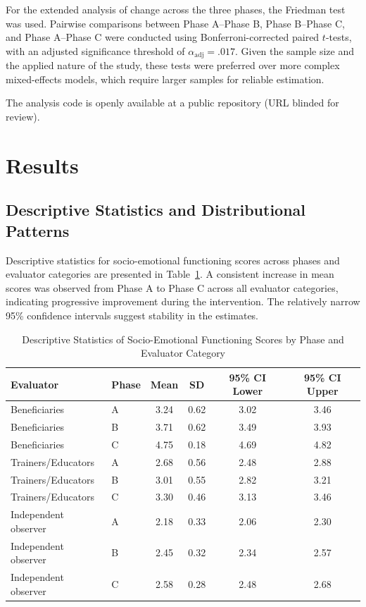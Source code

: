 \documentclass[12pt,a4paper]{article}
\begin{document}
For the extended analysis of change across the three phases, the Friedman test was used. Pairwise comparisons between Phase A--Phase B, Phase B--Phase C, and Phase A--Phase C were conducted using Bonferroni-corrected paired $t$-tests, with an adjusted significance threshold of $\alpha_{\mathrm{adj}}=.017$. Given the sample size and the applied nature of the study, these tests were preferred over more complex mixed-effects models, which require larger samples for reliable estimation.

The analysis code is openly available at a public repository (URL blinded for review).


\section{Results}

\subsection{Descriptive Statistics and Distributional Patterns}

Descriptive statistics for socio-emotional functioning scores across phases and evaluator categories are presented in Table~\ref{tab:descriptive_statistics}. A consistent increase in mean scores was observed from Phase A to Phase C across all evaluator categories, indicating progressive improvement during the intervention. The relatively narrow 95\% confidence intervals suggest stability in the estimates.

\begin{table}[!t]
\caption{Descriptive Statistics of Socio-Emotional Functioning Scores by Phase and Evaluator Category}
\label{tab:descriptive_statistics}
\centering
\begin{tabular}{llcccc}
\hline
\textbf{Evaluator} & \textbf{Phase} & \textbf{Mean} & \textbf{SD} & \textbf{95\% CI Lower} & \textbf{95\% CI Upper} \\
\hline
Beneficiaries & A & 3.24 & 0.62 & 3.02 & 3.46 \\
Beneficiaries & B & 3.71 & 0.62 & 3.49 & 3.93 \\
Beneficiaries & C & 4.75 & 0.18 & 4.69 & 4.82 \\
Trainers/Educators & A & 2.68 & 0.56 & 2.48 & 2.88 \\
Trainers/Educators & B & 3.01 & 0.55 & 2.82 & 3.21 \\
Trainers/Educators & C & 3.30 & 0.46 & 3.13 & 3.46 \\
Independent observer & A & 2.18 & 0.33 & 2.06 & 2.30 \\
Independent observer & B & 2.45 & 0.32 & 2.34 & 2.57 \\
Independent observer & C & 2.58 & 0.28 & 2.48 & 2.68 \\
\hline
\end{tabular}
\end{table}
\end{document}
